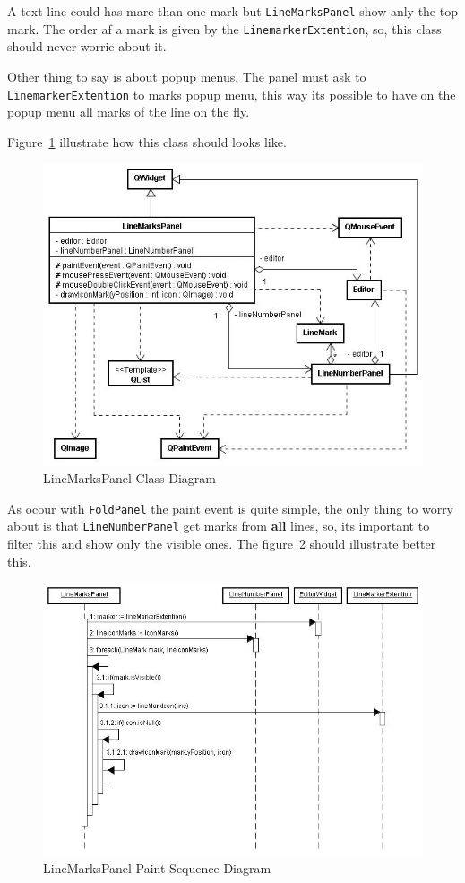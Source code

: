 \documentclass[11pt,a4paper]{report}
\begin{document}
A text line could has mare than one mark but \texttt{LineMarksPanel} show anly the top mark. The order af a mark is given by the \texttt{LinemarkerExtention}, so, this class should never worrie about it.

Other thing to say is about popup menus. The panel must ask to \texttt{LinemarkerExtention} to marks popup menu, this way its possible to have on the popup menu all marks of the line on the fly.

Figure~\ref{linemarkspanel} illustrate how this class should looks like.

\begin{figure}[hbt]
\centering
\includegraphics{images/linemarkspanel.jpg}
\caption{LineMarksPanel Class Diagram} \label{linemarkspanel}
\end{figure}

As ocour with \texttt{FoldPanel} the paint event is quite simple, the only thing to worry about is that \texttt{LineNumberPanel} get marks from \textbf{all} lines, so, its important to filter this and show only the visible ones. The figure~\ref{linemarkspanelpaint} should illustrate better this.

\begin{figure}[hbt]
\centering
\includegraphics{images/linemarkspanelpaint.jpg}
\caption{LineMarksPanel Paint Sequence Diagram} \label{linemarkspanelpaint}
\end{figure}
\end{document}
